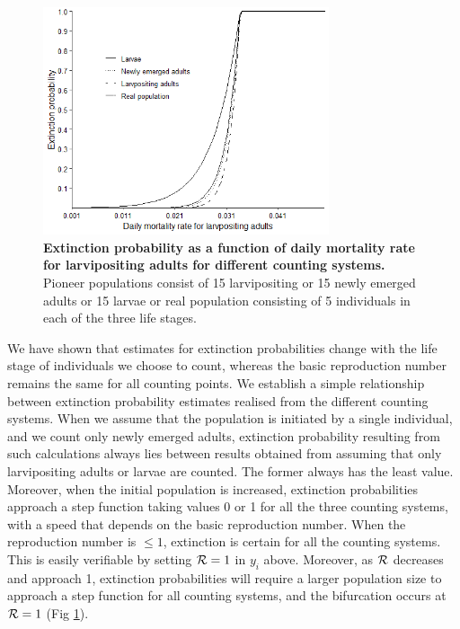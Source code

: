 \documentclass[smallextended]{svjour3}
\begin{document}
\begin{figure}[h]
	\includegraphics[width=0.75\textwidth]{Extinction15individuals.png}
	\caption{{\bf Extinction probability as a function of daily mortality rate for larvipositing adults for different counting systems.}  Pioneer populations consist of 15 larvipositing or 15 newly emerged adults or 15 larvae or real population consisting of 5 individuals in each of the three life stages.}
	\label{ExtLarviposMort15indiv}
\end{figure}


We have shown that estimates for extinction probabilities change with the life stage of individuals we choose to count, whereas the basic reproduction number remains the same for all counting points. We establish a simple relationship between extinction probability estimates realised from the different counting systems. When we assume that the population is initiated by a single individual, and we count only newly emerged adults, extinction probability resulting from such calculations always lies between results obtained from assuming that only larvipositing adults or larvae are counted. The former always has the least value. Moreover, when the initial population is increased, extinction probabilities approach a step function taking values 0 or 1 for all the three counting systems, with a speed that depends on the basic reproduction number. When the reproduction number is $\leq 1$, extinction is certain for all the counting systems. This is easily verifiable by setting ${\cal R} =1$ in $y_i$ above.  Moreover, as ${\cal R}$ decreases and approach 1, extinction probabilities will require a larger population size to approach a step function for all counting systems, and the bifurcation occurs at ${\cal R} =1$ (Fig  \ref{ExtLarviposMort15indiv}).
\end{document}
